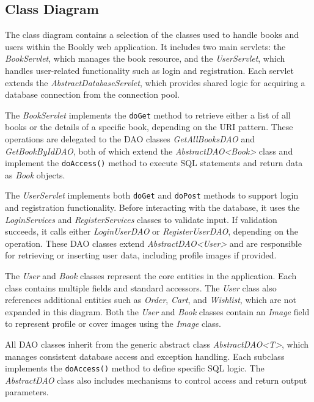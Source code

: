 \subsection{Class Diagram}


The class diagram contains a selection of the classes used to handle books and users within the Bookly web application. It includes two main servlets: the \textit{BookServlet}, which manages the book resource, and the \textit{UserServlet}, which handles user-related functionality such as login and registration. Each servlet extends the \textit{AbstractDatabaseServlet}, which provides shared logic for acquiring a database connection from the connection pool.
\medskip

The \textit{BookServlet} implements the \texttt{doGet} method to retrieve either a list of all books or the details of a specific book, depending on the URI pattern. These operations are delegated to the DAO classes \textit{GetAllBooksDAO} and \textit{GetBookByIdDAO}, both of which extend the \textit{AbstractDAO\textless Book\textgreater} class and implement the \texttt{doAccess()} method to execute SQL statements and return data as \textit{Book} objects.

\medskip

The \textit{UserServlet} implements both \texttt{doGet} and \texttt{doPost} methods to support login and registration functionality. Before interacting with the database, it uses the \textit{LoginServices} and \textit{RegisterServices} classes to validate input. If validation succeeds, it calls either \textit{LoginUserDAO} or \textit{RegisterUserDAO}, depending on the operation. These DAO classes extend \textit{AbstractDAO\textless User\textgreater} and are responsible for retrieving or inserting user data, including profile images if provided.
\medskip

The \textit{User} and \textit{Book} classes represent the core entities in the application. Each class contains multiple fields and standard accessors. The \textit{User} class also references additional entities such as \textit{Order}, \textit{Cart}, and \textit{Wishlist}, which are not expanded in this diagram. Both the \textit{User} and \textit{Book} classes contain an \textit{Image} field to represent profile or cover images using the \textit{Image} class.
\medskip

All DAO classes inherit from the generic abstract class \textit{AbstractDAO\textless T\textgreater}, which manages consistent database access and exception handling. Each subclass implements the \texttt{doAccess()} method to define specific SQL logic. The \textit{AbstractDAO} class also includes mechanisms to control access and return output parameters.

